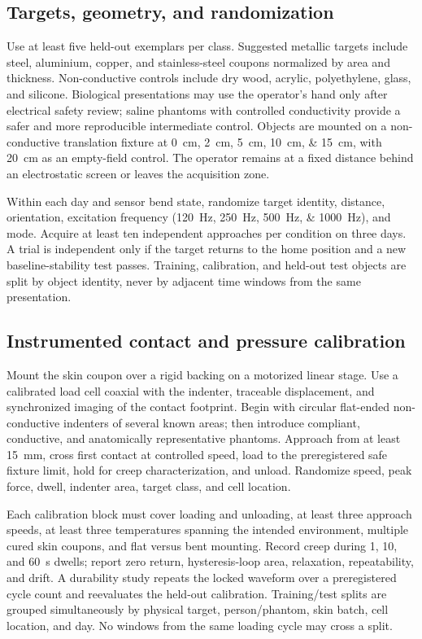 \documentclass[10pt]{article}
\begin{document}
\subsection{Targets, geometry, and randomization}
Use at least five held-out exemplars per class. Suggested metallic targets include steel, aluminium, copper, and stainless-steel coupons normalized by area and thickness. Non-conductive controls include dry wood, acrylic, polyethylene, glass, and silicone. Biological presentations may use the operator's hand only after electrical safety review; saline phantoms with controlled conductivity provide a safer and more reproducible intermediate control. Objects are mounted on a non-conductive translation fixture at \SIlist{0;2;5;10;15}{\centi\metre}, with \SI{20}{\centi\metre} as an empty-field control. The operator remains at a fixed distance behind an electrostatic screen or leaves the acquisition zone.

Within each day and sensor bend state, randomize target identity, distance, orientation, excitation frequency (\SIlist{120;250;500;1000}{\hertz}), and mode. Acquire at least ten independent approaches per condition on three days. A trial is independent only if the target returns to the home position and a new baseline-stability test passes. Training, calibration, and held-out test objects are split by object identity, never by adjacent time windows from the same presentation.

\subsection{Instrumented contact and pressure calibration}
Mount the skin coupon over a rigid backing on a motorized linear stage. Use a calibrated load cell coaxial with the indenter, traceable displacement, and synchronized imaging of the contact footprint. Begin with circular flat-ended non-conductive indenters of several known areas; then introduce compliant, conductive, and anatomically representative phantoms. Approach from at least \SI{15}{\milli\metre}, cross first contact at controlled speed, load to the preregistered safe fixture limit, hold for creep characterization, and unload. Randomize speed, peak force, dwell, indenter area, target class, and cell location.

Each calibration block must cover loading and unloading, at least three approach speeds, at least three temperatures spanning the intended environment, multiple cured skin coupons, and flat versus bent mounting. Record creep during 1, 10, and \SI{60}{\second} dwells; report zero return, hysteresis-loop area, relaxation, repeatability, and drift. A durability study repeats the locked waveform over a preregistered cycle count and reevaluates the held-out calibration. Training/test splits are grouped simultaneously by physical target, person/phantom, skin batch, cell location, and day. No windows from the same loading cycle may cross a split.
\end{document}
